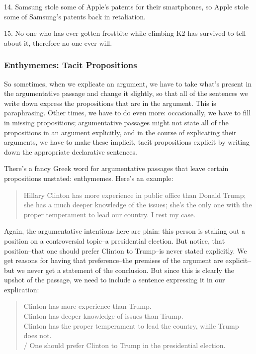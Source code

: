 14. Samsung stole some of Apple's patents for their smartphones, so Apple
    stole some of Samsung's patents back in retaliation.

15. No one who has ever gotten frostbite while climbing K2 has survived to
    tell about it, therefore no one ever will.






\subsubsection{Enthymemes: Tacit Propositions}
So sometimes, when we explicate an argument, we have to take what's present in the
argumentative passage and change it slightly, so that all of the sentences we write down express
the propositions that are in the argument. This is paraphrasing. Other times, we have to do even
more: occasionally, we have to fill in missing propositions; argumentative passages might not state
all of the propositions in an argument explicitly, and in the course of explicating their arguments,
we have to make these implicit, tacit propositions explicit by writing down the appropriate
declarative sentences.

There's a fancy Greek word for argumentative passages that leave certain propositions unstated:
enthymemes. Here's an example:

\begin{quote}
Hillary Clinton has more experience in public office than Donald Trump; she has a much
deeper knowledge of the issues; she's the only one with the proper temperament to lead
our country. I rest my case.
\end{quote}

Again, the argumentative intentions here are plain: this person is staking out a position on a
controversial topic--a presidential election. But notice, that position--that one should prefer
Clinton to Trump--is never stated explicitly. We get reasons for having that preference--the
premises of the argument are explicit--but we never get a statement of the conclusion. But since
this is clearly the upshot of the passage, we need to include a sentence expressing it in our
explication:

\begin{quote}
Clinton has more experience than Trump. \\
Clinton has deeper knowledge of issues than Trump. \\
Clinton has the proper temperament to lead the country, while Trump does not. \\
/ One should prefer Clinton to Trump in the presidential election. \\
\end{quote}

